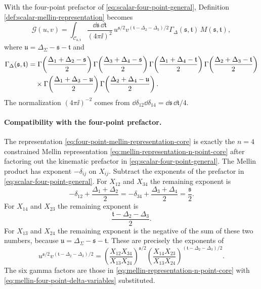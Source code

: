 With the four-point prefactor of
\eqref{eq:scalar-four-point-general}, Definition
\ref{def:scalar-mellin-representation} becomes
\begin{equation}
  \mathcal G(u,v)
  =
  \int_{\mathcal C_{\mathfrak s,\mathfrak t}}
  \frac{\dd\mathfrak s\,\dd\mathfrak t}{(4\pi\ii)^2}\,
  u^{\mathfrak s/2}
  v^{(\mathfrak t-\Delta_2-\Delta_3)/2}
  \Gamma_\Delta(\mathfrak s,\mathfrak t)\,
  M(\mathfrak s,\mathfrak t),
  \label{eq:four-point-mellin-representation-core}
\end{equation}
where \(\mathfrak u=\Delta_\Sigma-\mathfrak s-\mathfrak t\) and
\begin{align}
  \Gamma_\Delta(\mathfrak s,\mathfrak t)
  &=
  \Gamma\!\left(\frac{\Delta_1+\Delta_2-\mathfrak s}{2}\right)
  \Gamma\!\left(\frac{\Delta_3+\Delta_4-\mathfrak s}{2}\right)
  \Gamma\!\left(\frac{\Delta_1+\Delta_4-\mathfrak t}{2}\right)
  \Gamma\!\left(\frac{\Delta_2+\Delta_3-\mathfrak t}{2}\right)
  \notag\\
  &\quad\times
  \Gamma\!\left(\frac{\Delta_1+\Delta_3-\mathfrak u}{2}\right)
  \Gamma\!\left(\frac{\Delta_2+\Delta_4-\mathfrak u}{2}\right).
  \label{eq:four-point-mellin-gamma-kernel}
\end{align}
The normalization \((4\pi\ii)^{-2}\) comes from
\(\dd\delta_{12}\dd\delta_{14}=\dd\mathfrak s\,\dd\mathfrak t/4\).

\paragraph{Compatibility with the four-point prefactor.}
The representation \eqref{eq:four-point-mellin-representation-core} is exactly
the \(n=4\) constrained Mellin representation
\eqref{eq:mellin-representation-n-point-core} after factoring out the
kinematic prefactor in \eqref{eq:scalar-four-point-general}.
The Mellin product has exponent \(-\delta_{ij}\) on \(X_{ij}\).  Subtract the
exponents of the prefactor in \eqref{eq:scalar-four-point-general}.  For
\(X_{12}\) and \(X_{34}\) the remaining exponent is
\[
  -\delta_{12}+\frac{\Delta_1+\Delta_2}{2}
  =
  -\delta_{34}+\frac{\Delta_3+\Delta_4}{2}
  =
  \frac{\mathfrak s}{2}.
\]
For \(X_{14}\) and \(X_{23}\) the remaining exponent is
\[
  \frac{\mathfrak t-\Delta_2-\Delta_3}{2}.
\]
For \(X_{13}\) and \(X_{24}\) the remaining exponent is the negative of the
sum of these two numbers, because
\(\mathfrak u=\Delta_\Sigma-\mathfrak s-\mathfrak t\).  These are precisely
the exponents of
\[
  u^{\mathfrak s/2}v^{(\mathfrak t-\Delta_2-\Delta_3)/2}
  =
  \left(\frac{X_{12}X_{34}}{X_{13}X_{24}}\right)^{\mathfrak s/2}
  \left(\frac{X_{14}X_{23}}{X_{13}X_{24}}\right)^{
        (\mathfrak t-\Delta_2-\Delta_3)/2}.
\]
The six gamma factors are those in
\eqref{eq:mellin-representation-n-point-core} with
\eqref{eq:mellin-four-point-delta-variables} substituted.

